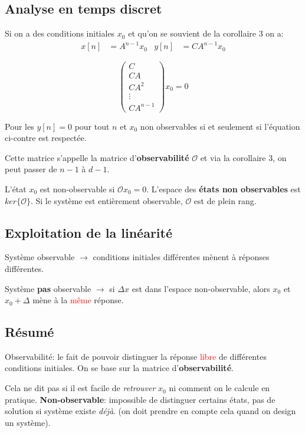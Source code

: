 \documentclass{report}
\begin{document}
\subsection{Analyse en temps discret}
Si on a des conditions initiales $x_0$ et qu'on se souvient de la corollaire 3 on a:
\begin{align*}
x[n] &= A^{n-1} x_0 & y[n] &= C A^{n-1} x_0
\end{align*}
\begin{figure}
\centering
\begin{equation}
\begin{pmatrix}
C\\
CA\\
CA^2\\
\vdots\\
CA^{n-1}
\end{pmatrix} x_0 = 0
\end{equation}
\end{figure}
Pour les $y[n] = 0$ pour tout $n$ et $x_0$ non observables si et seulement si l'équation ci-contre est respectée.\par 
Cette matrice s'appelle la matrice d'\textbf{observabilité} $\mathcal{O}$ et via la corollaire 3, on peut passer de $n-1$ à $d-1$.\par 
L'état $x_0$ est non-observable si $\mathcal{O}x_0 = 0$. L'espace des \textbf{états non observables} est $ker \{\mathcal{O}\}$. Si le système est entièrement observable, $\mathcal{O}$ est de plein rang.

\subsection{Exploitation de la linéarité}
Système observable $\rightarrow$ conditions initiales différentes mènent à réponses différentes.\par 
Système \textbf{pas} observable $\rightarrow$ si $\Delta x$ est dans l'espace non-observable, alors $x_0$ et $x_0 + \Delta$ mène à la \textcolor{red}{même} réponse.

\subsection{Résumé}
Observabilité: le fait de pouvoir distinguer la réponse \textcolor{red}{libre} de différentes conditions initiales. On se base sur la matrice d'\textbf{observabilité}.\par 
Cela ne dit pas si il est facile de \textit{retrouver} $x_0$ ni comment on le calcule en pratique. \textbf{Non-observable}: impossible de distinguer certains états, pas de solution si système existe \textit{déjà}. (on doit prendre en compte cela quand on design un système).
\end{document}
